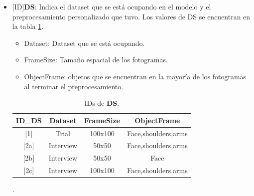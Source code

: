 \begin{onehalfspacing}
\begin{itemize}
    \item  {[ID]\textbf{DS}}: Indica el dataset que se está ocupando en el modelo y el preprocesamiento personalizado que tuvo. Los valores de DS se encuentran en la tabla \ref{tab:DS}.
    \begin{itemize}
        \item Dataset: Dataset que se está ocupando.
        \item  FrameSize: Tamaño espacial de los fotogramas.
        \item ObjectFrame: objetos que se encuentran en la mayoría de los fotogramas al terminar el preprocesamiento.
    \end{itemize}
    
    \begin{table}[h!]
    \centering
    \begin{tabular}{|c|c|c|c|}
        \hline 
        ID\_DS & Dataset & FrameSize & ObjectFrame\tabularnewline
        \hline 
        \hline 
        {[}1{]} & Trial & 100x100 & Face,shoulders,arms\tabularnewline
        \hline 
        {[}2a{]} & Interview & 50x50 & Face,shoulders,arms\tabularnewline
        \hline 
        {[}2b{]} & Interview & 50x50 & Face\tabularnewline
        \hline 
        {[}2c{]} & Interview & 100x100 & Face,shoulders,arms\tabularnewline
        \hline 
    \end{tabular}
    \caption{\footnotesize IDs de \textbf{DS}.}.
    \label{tab:DS}
    \end{table} 
    

\end{itemize}
\end{onehalfspacing}
